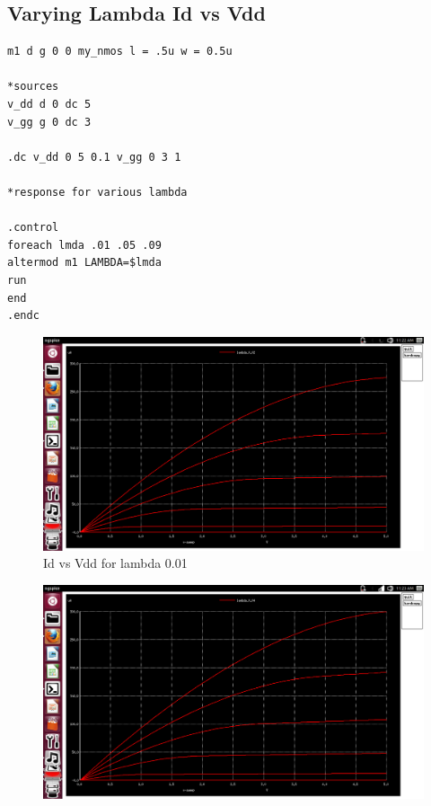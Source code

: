 \documentclass[12pt,a4paper]{article}
\begin{document}
\begin{center}
\subsection{Varying Lambda Id vs Vdd}
\begin{lstlisting}
m1 d g 0 0 my_nmos l = .5u w = 0.5u

*sources
v_dd d 0 dc 5
v_gg g 0 dc 3

.dc v_dd 0 5 0.1 v_gg 0 3 1

*response for various lambda 

.control
foreach lmda .01 .05 .09
altermod m1 LAMBDA=$lmda
run
end 
.endc
\end{lstlisting}


\begin{figure}[!ht]
\centering
\includegraphics[scale=0.34]{lambda1a.png}
\caption[Short]{Id vs Vdd for lambda 0.01}
\end{figure}

\begin{figure}[!ht]
\includegraphics[scale=0.32]{lambda1b.png}


\end{figure}
\end{center}
\end{document}
